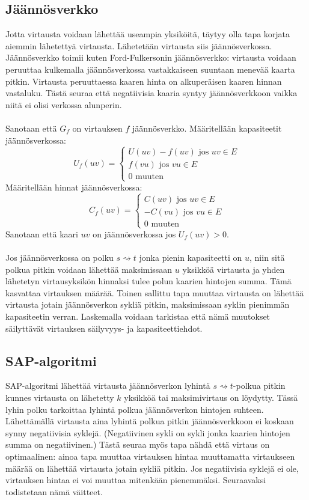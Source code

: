 \documentclass[a4paper, 11pt]{article}
\begin{document}
\subsection*{Jäännösverkko}
Jotta virtausta voidaan lähettää useampia yksiköitä, täytyy olla tapa korjata aiemmin lähetettyä
virtausta. Lähetetään virtausta siis jäännösverkossa. Jäännösverkko toimii kuten Ford-Fulkersonin
jäännösverkko: virtausta voidaan peruuttaa kulkemalla jäännösverkossa vastakkaiseen suuntaan
menevää kaarta pitkin. Virtausta peruuttaessa kaaren hinta on alkuperäisen kaaren hinnan vastaluku.
Tästä seuraa että negatiivisia kaaria syntyy jäännösverkkoon vaikka niitä ei olisi verkossa alunperin.\\\\
Sanotaan että $G_f$ on virtauksen $f$ jäännösverkko. Määritellään kapasiteetit
jäännösverkossa:\\
$$U_f(uv) = \begin{cases} U(uv) - f(uv) \text{ jos } uv \in E\\
f(vu) \text{ jos } vu \in E\\
0 \text{ muuten}
\end{cases}$$
Määritellään hinnat jäännösverkossa:\\
$$C_f(uv) = \begin{cases} C(uv) \text{ jos } uv \in E\\
-C(vu) \text{ jos } vu \in E\\
0 \text{ muuten}
\end{cases}$$
Sanotaan että kaari $uv$ on jäännösverkossa jos $U_f(uv) > 0$.\\\\
\noindent
Jos jäännösverkossa on polku $s \rightsquigarrow t$ jonka pienin kapasiteetti 
on $u$, niin sitä polkua pitkin voidaan lähettää maksimissaan $u$ yksikköä
virtausta ja yhden lähetetyn virtausyksikön hinnaksi tulee polun kaarien hintojen summa.
Tämä kasvattaa virtauksen määrää. Toinen sallittu tapa muuttaa virtausta
on lähettää virtausta jotain jäännösverkon sykliä pitkin, maksimissaan syklin pienimmän
kapasiteetin verran. Laskemalla voidaan tarkistaa että nämä muutokset säilyttävät
virtauksen säilyvyys- ja kapasiteettiehdot.
\subsection*{SAP-algoritmi}
\noindent
SAP-algoritmi lähettää virtausta jäännösverkon lyhintä $s \rightsquigarrow t$-polkua
pitkin kunnes virtausta on lähetetty $k$ yksikköä tai maksimivirtaus on löydytty.
Tässä lyhin polku tarkoittaa lyhintä polkua jäännösverkon hintojen suhteen.
Lähettämällä virtausta aina lyhintä polkua pitkin jäännösverkkoon ei koskaan synny
negatiivisia syklejä. (Negatiivinen sykli on sykli jonka kaarien hintojen summa on negatiivinen.) 
Tästä seuraa myös tapa nähdä että virtaus on optimaalinen:
ainoa tapa muuttaa virtauksen hintaa muuttamatta virtaukseen määrää on lähettää virtausta
jotain sykliä pitkin. Jos negatiivisia syklejä ei ole, virtauksen hintaa ei voi muuttaa
mitenkään pienemmäksi.
Seuraavaksi todistetaan nämä väitteet.
\noindent
\end{document}
